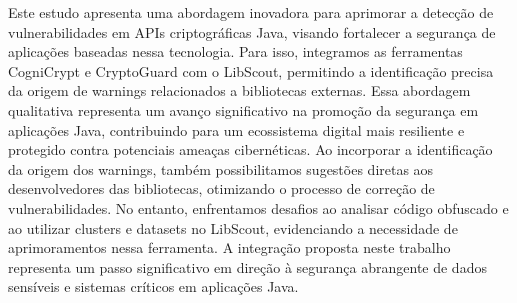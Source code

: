 
Este estudo apresenta uma abordagem inovadora para aprimorar a detecção de vulnerabilidades em APIs
criptográficas Java, visando fortalecer a segurança de aplicações baseadas nessa tecnologia. 
Para isso, integramos as ferramentas CogniCrypt e CryptoGuard com o LibScout, permitindo a 
identificação precisa da origem de warnings relacionados a bibliotecas externas. 
Essa abordagem qualitativa representa um avanço significativo na promoção da segurança em aplicações Java,
contribuindo para um ecossistema digital mais resiliente e protegido contra potenciais 
ameaças cibernéticas. Ao incorporar a identificação da origem dos warnings, também possibilitamos 
sugestões diretas aos desenvolvedores das bibliotecas, otimizando o processo de correção de 
vulnerabilidades. No entanto, enfrentamos desafios ao analisar código obfuscado e ao utilizar 
clusters e datasets no LibScout, evidenciando a necessidade de aprimoramentos nessa ferramenta. 
A integração proposta neste trabalho representa um passo significativo em direção à segurança 
abrangente de dados sensíveis e sistemas críticos em aplicações Java.